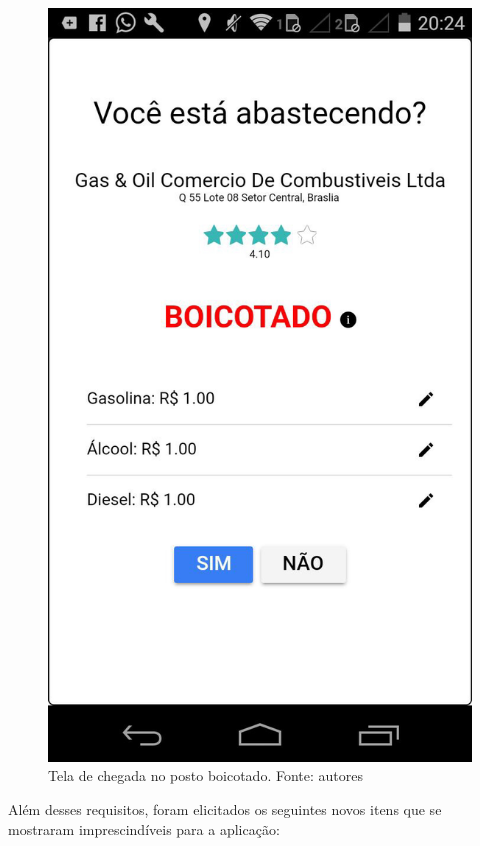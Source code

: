 \begin{figure}[H]
    \centering
    \includegraphics[scale=0.2]{figuras/chegou-posto.jpg}
    \caption[Tela de chegada no posto boicotado]{Tela de chegada no posto boicotado. Fonte: autores}
    \label{img:chegou-posto-boicotado}
\end{figure}

Além desses requisitos, foram elicitados os seguintes novos itens que se mostraram imprescindíveis para a aplicação:

